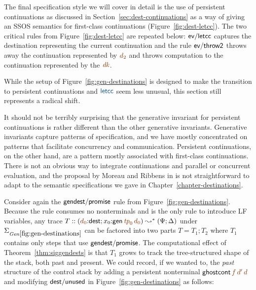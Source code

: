 The final specification style we will cover in detail is the use of
persistent continuations as discussed in
Section~\ref{sec:dest-continuations} as a way of giving an SSOS
semantics for first-class continuations (Figure~\ref{fig:dest-letcc}).
The two critical rules from Figure~\ref{fig:dest-letcc} are repeated
below: ${\sf ev/letcc}$ captures the destination representing the
current continuation and the rule ${\sf ev/throw2}$ throws away
the continuation represented by $\lf{d_2}$ and throws computation to the
continuation represented by the
$\lf{\it dk}$. 

\smallskip
{}
\smallskip

\noindent
While the setup of Figure~\ref{fig:gen-destinations} is designed to
make the transition to persistent continuations and $\obj{\sf letcc}$
seem less unusual, this section still represents a radical shift.  

It should not be terribly surprising that the generative invariant for
persistent continuations is rather different than the other generative
invariants. Generative invariants capture patterns of specification,
and we have mostly concentrated on patterns that facilitate
concurrency and communication. Persistent continuations, on the other
hand, are a pattern mostly associated with first-class
continuations. There is not an obvious way to integrate
continuations and parallel or concurrent evaluation, and the proposal
by Moreau and Ribbens in \cite{moreau96semantics} is not
straightforward to adapt to the semantic specifications we gave in
Chapter~\ref{chapter-destinations}.

Consider again the ${\sf gendest/promise}$ rule from
Figure~\ref{fig:gen-destinations}. Because the rule consumes no
nonterminals and is the only rule to introduce LF variables, any trace
$T :: \left(\lf{d_0}{:}{\sf dest}; x_0{:}{\sf gen}\,\lf{{\it
      tp}_0}\,\lf{d_0}\right) \leadsto^* {(\Psi;
  \Delta)}{}$ under $\siggendests$ can be factored into two parts $T =
T_1; T_2$ where $T_1$ contains only steps that use ${\sf
  gendest/promise}$. The computational effect of
Theorem~\ref{thm:siggendests} is that $T_1$ grows to track the
tree-structured shape of the stack, both past and present. We could
record, if we wanted to, the {\it past} structure of the control stack
by adding a persistent nonterminal ${\sf
  ghostcont}\,\lf{f}\,\lf{d'}\,\lf{d}$ and modifying ${\sf dest/unused}$
in Figure~\ref{fig:gen-destinations} as follows:

